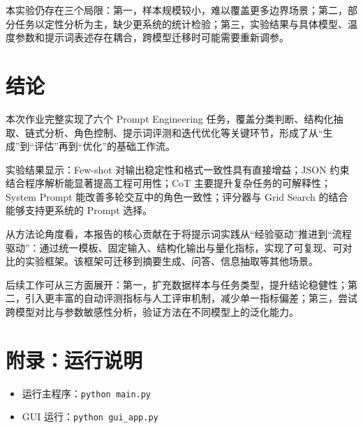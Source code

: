 \documentclass[UTF8, a4paper, 12pt]{ctexart}
\begin{document}
本实验仍存在三个局限：第一，样本规模较小，难以覆盖更多边界场景；第二，部分任务以定性分析为主，缺少更系统的统计检验；第三，实验结果与具体模型、温度参数和提示词表述存在耦合，跨模型迁移时可能需要重新调参。

\section{结论}

本次作业完整实现了六个 Prompt Engineering 任务，覆盖分类判断、结构化抽取、链式分析、角色控制、提示词评测和迭代优化等关键环节，形成了从“生成”到“评估”再到“优化”的基础工作流。

实验结果显示：Few-shot 对输出稳定性和格式一致性具有直接增益；JSON 约束结合程序解析能显著提高工程可用性；CoT 主要提升复杂任务的可解释性；System Prompt 能改善多轮交互中的角色一致性；评分器与 Grid Search 的结合能够支持更系统的 Prompt 选择。

从方法论角度看，本报告的核心贡献在于将提示词实践从“经验驱动”推进到“流程驱动”：通过统一模板、固定输入、结构化输出与量化指标，实现了可复现、可对比的实验框架。该框架可迁移到摘要生成、问答、信息抽取等其他场景。

后续工作可从三方面展开：第一，扩充数据样本与任务类型，提升结论稳健性；第二，引入更丰富的自动评测指标与人工评审机制，减少单一指标偏差；第三，尝试跨模型对比与参数敏感性分析，验证方法在不同模型上的泛化能力。

\section*{附录：运行说明}

\begin{itemize}
  \item 运行主程序：\texttt{python main.py}
  \item GUI 运行：\texttt{python gui\_app.py}
\end{itemize}
\end{document}
